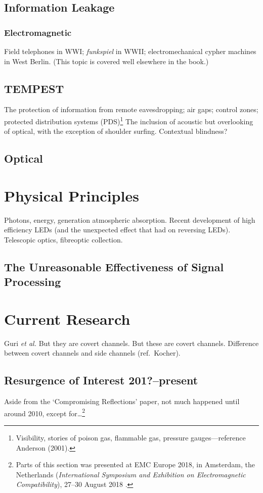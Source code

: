 \documentclass[a4paper,twoside]{book}
\begin{document}
\subsection{Information Leakage}
\subsubsection{Electromagnetic}
Field telephones in WWI; {\it funkspiel} in WWII; electromechanical cypher
machines in West Berlin. (This topic is covered well elsewhere in the book.)
\subsection{TEMPEST}
The protection of information from remote eavesdropping; air gaps; control
zones; protected distribution systems (PDS)\footnote{Visibility, stories of
poison gas, flammable gas, pressure gauges---reference Anderson (2001).} The
inclusion of acoustic but overlooking of optical, with the exception of
shoulder surfing. Contextual blindness?
\subsection{Optical}
\section{Physical Principles}
Photons, energy, generation atmospheric absorption. Recent development of
high efficiency LEDs (and the unexpected effect that had on reversing LEDs).
Telescopic optics, fibreoptic collection.
\subsection{The Unreasonable Effectiveness of Signal Processing}
\section{Current Research}
Guri {\it et al.} But they are covert channels. But these are covert
channels. Difference between covert channels and side channels
(ref.\ Kocher).
\subsection{Resurgence of Interest 201?--present}
Aside from the `Compromising Reflections' paper, not much happened until
around 2010, except for\ldots\footnote{Parts of this section was presented at
EMC Europe 2018, in Amsterdam, the Netherlands (\emph{International Symposium
and Exhibition on Electromagnetic Compatibility}), 27--30 August 2018
\cite{Loughry2018a}.}
\end{document}
